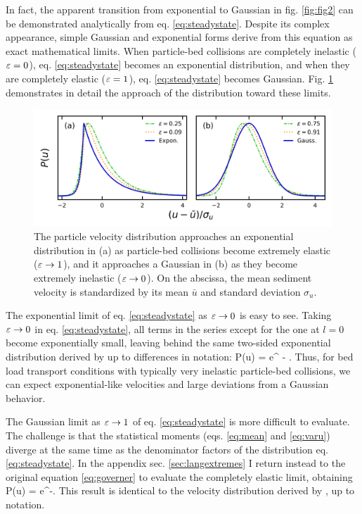 In fact, the apparent transition from exponential to Gaussian in fig. \ref{fig:fig2} can be demonstrated analytically from eq. \ref{eq:steadystate}. Despite its complex appearance, simple Gaussian and exponential forms derive from this equation as exact mathematical limits.
When particle-bed collisions are completely inelastic ($\varepsilon = 0$), eq. \ref{eq:steadystate} becomes an exponential distribution, and when they are completely elastic ($\varepsilon = 1$), eq. \ref{eq:steadystate} becomes Gaussian.
Fig. \ref{fig:fig3} demonstrates in detail the approach of the distribution toward these limits.
\begin{figure}
	\centerline{\includegraphics{./figures/ch5/Fig3asymptotic.png}}
	\caption{The particle velocity distribution approaches an exponential distribution in (a) as particle-bed collisions become extremely elastic ($\varepsilon \rightarrow 1$), and it approaches a Gaussian in (b) as they become extremely inelastic ($\varepsilon \rightarrow 0$). On the abscissa, the mean sediment velocity is standardized by its mean $\bar{u}$ and standard deviation $\sigma_u$. }
	\label{fig:fig3}
\end{figure}

The exponential limit of eq. \ref{eq:steadystate} as $\varepsilon \rightarrow 0$ is easy to see. Taking $\varepsilon \rightarrow 0 $ in eq. \ref{eq:steadystate}, all terms in the series except for the one at $l=0$ become exponentially small, leaving behind the same two-sided exponential distribution derived by \cite{Fan2014} up to differences in notation:
\be P(u) = e^{ - }. \ee
Thus, for bed load transport conditions with typically very inelastic particle-bed collisions, we can expect exponential-like velocities and large deviations from a Gaussian behavior.

The Gaussian limit as $\varepsilon \rightarrow 1$ of eq. \ref{eq:steadystate} is more difficult to evaluate. The challenge is that the statistical moments (eqs. \ref{eq:mean} and \ref{eq:varu}) diverge at the same time as the denominator factors of the distribution eq. \ref{eq:steadystate}. In the appendix sec. \ref{sec:langextremes} I return instead to the original equation \ref{eq:governer} to evaluate the completely elastic limit, obtaining
\be P(u) = e^{-}. \label{eq:gaussian}\ee
This result is identical to the velocity distribution derived by \citet{Ancey2014}, up to notation.

